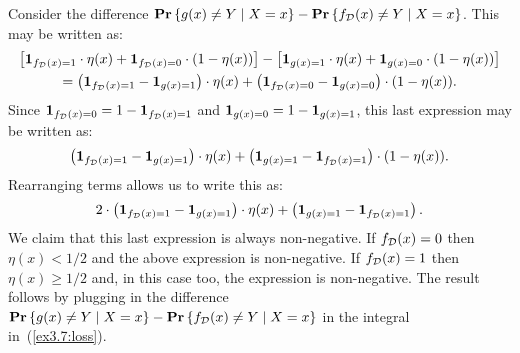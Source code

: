 Consider the difference $\mathbf{Pr} \left \{ g(x) \neq Y \mid X = x \right \} - \mathbf{Pr} \left \{ f_{\mathcal{D}}(x) \neq Y \mid X = x \right \}$.
This may be written as:
\begin{multline*}
\left [ \mathbf{1}_{f_{\mathcal{D}} (x) = 1} \cdot \eta (x)  +
        \mathbf{1}_{f_{\mathcal{D}} (x) = 0} \cdot (1 - \eta (x)) \right ] -
\left [ \mathbf{1}_{g(x) = 1} \cdot \eta (x)  +
        \mathbf{1}_{g(x) = 0} \cdot (1 - \eta (x)) \right ]  \\
  = \left ( \mathbf{1}_{f_{\mathcal{D}} (x) = 1} - \mathbf{1}_{g(x) = 1} \right ) \cdot \eta(x) +
  \left ( \mathbf{1}_{f_{\mathcal{D}} (x) = 0} - \mathbf{1}_{g(x) = 0} \right ) \cdot (1 - \eta(x)).
\end{multline*}
Since $\mathbf{1}_{f_{\mathcal{D}} (x) = 0} = 1 - \mathbf{1}_{f_{\mathcal{D}} (x) = 1}$ and
$\mathbf{1}_{g (x) = 0} = 1 - \mathbf{1}_{g(x) = 1}$, this last expression may be written as:
\[\left ( \mathbf{1}_{f_{\mathcal{D}} (x) = 1} - \mathbf{1}_{g(x) = 1} \right ) \cdot \eta(x) +
  \left ( \mathbf{1}_{g (x) = 1} - \mathbf{1}_{f_{\mathcal{D}} (x) = 1} \right ) \cdot (1 - \eta(x)).
\]
Rearranging terms allows us to write this as:
\begin{equation}
2 \cdot \left ( \mathbf{1}_{f_{\mathcal{D}} (x) = 1} - \mathbf{1}_{g(x) = 1} \right ) \cdot \eta(x) +
  \left ( \mathbf{1}_{g (x) = 1} - \mathbf{1}_{f_{\mathcal{D}} (x) = 1} \right ).
\end{equation}
We claim that this last expression is always non-negative. If $f_{\mathcal{D}} (x) = 0$ then
$\eta (x) < 1/2$ and the above expression is non-negative. If $f_{\mathcal{D}} (x) = 1$ then
$\eta (x) \geq 1/2$ and, in this case too, the expression is non-negative. The result
follows by plugging in the difference
$\mathbf{Pr} \left \{ g(x) \neq Y \mid X = x \right \} - \mathbf{Pr} \left \{ f_{\mathcal{D}}(x) \neq Y \mid X = x \right \}$
in the integral in~(\ref{ex3.7:loss}).





